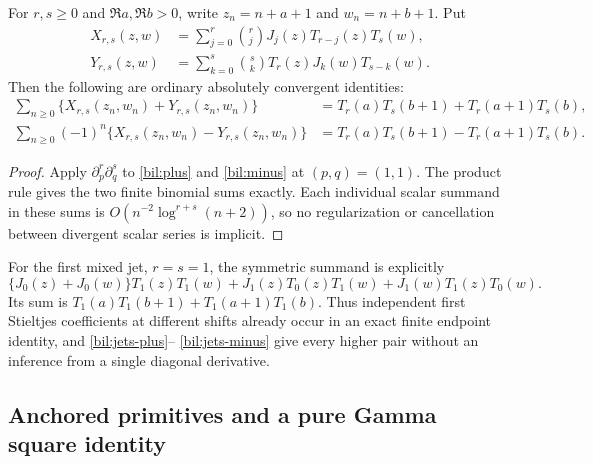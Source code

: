 \begin{theorem}
\label{bil:stieltjes-all}
For $r,s\ge0$ and $\Re a,\Re b>0$, write $z_n=n+a+1$ and
$w_n=n+b+1$. Put
\begin{align*}
 X_{r,s}(z,w)&=\sum_{j=0}^{r}\binom rj
                         J_j(z)T_{r-j}(z)T_s(w),\\
 Y_{r,s}(z,w)&=\sum_{k=0}^{s}\binom sk
                         T_r(z)J_k(w)T_{s-k}(w).
\end{align*}
Then the following are ordinary absolutely convergent identities:
\begin{align}
 \sum_{n\ge0}\{X_{r,s}(z_n,w_n)+Y_{r,s}(z_n,w_n)\}
 &=T_r(a)T_s(b+1)+T_r(a+1)T_s(b),\label{bil:jets-plus}\\
 \sum_{n\ge0}(-1)^n\{X_{r,s}(z_n,w_n)-Y_{r,s}(z_n,w_n)\}
 &=T_r(a)T_s(b+1)-T_r(a+1)T_s(b).\label{bil:jets-minus}
\end{align}
\end{theorem}
\begin{proof}
Apply $\partial_p^r\partial_q^s$ to \eqref{bil:plus} and
\eqref{bil:minus} at $(p,q)=(1,1)$. The product rule gives the two
finite binomial sums exactly. Each individual scalar summand in these
sums is $O(n^{-2}\log^{r+s}(n+2))$, so no regularization or
cancellation between divergent scalar series is implicit.
\end{proof}

For the first mixed jet, $r=s=1$, the symmetric summand is explicitly
\[
 \{J_0(z)+J_0(w)\}T_1(z)T_1(w)
 +J_1(z)T_0(z)T_1(w)+J_1(w)T_1(z)T_0(w).
\]
Its sum is $T_1(a)T_1(b+1)+T_1(a+1)T_1(b)$. Thus independent
first Stieltjes coefficients at different shifts already occur in
an exact finite endpoint identity, and \eqref{bil:jets-plus}--
\eqref{bil:jets-minus} give every higher pair without an inference
from a single diagonal derivative.

\subsection{Anchored primitives and a pure Gamma square identity}

